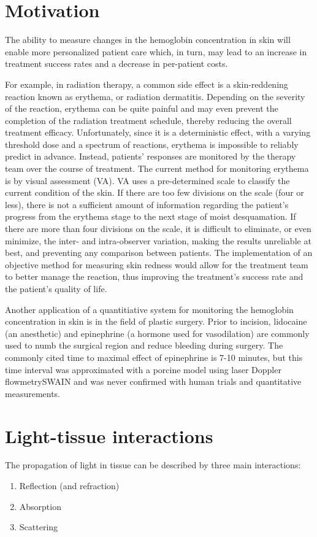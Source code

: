 \section{Motivation}
The ability to measure changes in the hemoglobin concentration in skin will enable more personalized patient care which, in turn, may lead to an increase in treatment success rates and a decrease in per-patient costs.

For example, in radiation therapy, a common side effect is a skin-reddening reaction known as erythema, or radiation dermatitis.\cite{McQuestion2006} Depending on the severity of the reaction, erythema can be quite painful and may even prevent the completion of the radiation treatment schedule, thereby reducing the overall treatment efficacy. Unfortunately, since it is a deterministic effect,\cite{Hall2000} with a varying threshold dose and a spectrum of reactions, erythema is impossible to reliably predict in advance. Instead, patients’ responses are monitored by the therapy team over the course of treatment. The current method for monitoring erythema is by visual assessment (VA). VA uses a pre-determined scale to classify the current condition of the skin. If there are too few divisions on the scale (four or less), there is not a sufficient amount of information regarding the patient’s progress from the erythema stage to the next stage of moist desquamation. If there are more than four divisions on the scale, it is difficult to eliminate, or even minimize, the inter- and intra-observer variation, making the results unreliable at best, and preventing any comparison between patients. The implementation of an objective method for measuring skin redness would allow for the treatment team to better manage the reaction, thus improving the treatment’s success rate and the patient’s quality of life.

Another application of a quantitiative system for monitoring the hemoglobin concentration in skin is in the field of plastic surgery. Prior to incision, lidocaine (an anesthetic) and epinephrine (a hormone used for vasodilation) are commonly used to numb the surgical region and reduce bleeding during surgery. The commonly cited time to maximal effect of epinephrine is 7-10 minutes, but this time interval was approximated with a porcine model\cite{Larrabee1987} using laser Doppler flowmetrySWAIN and was never confirmed with human trials and quantitative measurements.

\section{Light-tissue interactions}
The propagation of light in tissue can be described by three main interactions:\cite{Niemz2007}
\begin{enumerate}
	\item Reflection (and refraction)
	\item Absorption
	\item Scattering
\end{enumerate}

